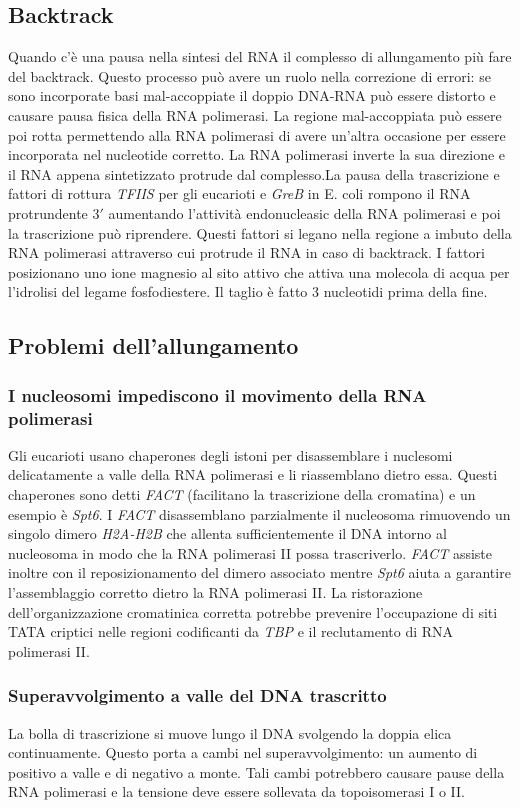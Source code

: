 \subsection{Backtrack}
Quando c'\`e una pausa nella sintesi del RNA il complesso di allungamento pi\`u fare del backtrack. Questo processo pu\`o avere un ruolo nella correzione di errori: se sono incorporate
basi mal-accoppiate il doppio DNA-RNA pu\`o essere distorto e causare pausa fisica della RNA polimerasi. La regione mal-accoppiata pu\`o essere poi rotta permettendo alla RNA polimerasi
di avere un'altra occasione per essere incorporata nel nucleotide corretto. La RNA polimerasi inverte la sua direzione e il RNA appena sintetizzato protrude dal complesso.La pausa
della trascrizione e fattori di rottura \emph{TFIIS} per gli eucarioti e \emph{GreB} in E. coli rompono il RNA protrundente $3'$ aumentando l'attivit\`a endonucleasic della RNA 
polimerasi e poi la trascrizione pu\`o riprendere. Questi fattori si legano nella regione a imbuto della RNA polimerasi attraverso cui protrude il RNA in caso di backtrack. I fattori 
posizionano uno ione magnesio al sito attivo che attiva una molecola di acqua per l'idrolisi del legame fosfodiestere. Il taglio \`e fatto $3$ nucleotidi prima della fine. 
\subsection{Problemi dell'allungamento}
\subsubsection{I nucleosomi impediscono il movimento della RNA polimerasi}
Gli eucarioti usano chaperones degli istoni per disassemblare i nuclesomi delicatamente a valle della RNA polimerasi e li riassemblano dietro essa. Questi chaperones sono detti 
\emph{FACT} (facilitano la trascrizione della cromatina) e un esempio \`e \emph{Spt6}. I \emph{FACT} disassemblano parzialmente il nucleosoma rimuovendo un singolo dimero
\emph{H2A-H2B} che allenta sufficientemente il DNA intorno al nucleosoma in modo che la RNA polimerasi II possa trascriverlo. \emph{FACT} assiste inoltre con il reposizionamento 
del dimero associato mentre \emph{Spt6} aiuta a garantire l'assemblaggio corretto dietro la RNA polimerasi II. La ristorazione dell'organizzazione cromatinica corretta potrebbe 
prevenire l'occupazione di siti TATA criptici nelle regioni codificanti da \emph{TBP} e il reclutamento di RNA polimerasi II. 
\subsubsection{Superavvolgimento a valle del DNA trascritto}
La bolla di trascrizione si muove lungo il DNA svolgendo la doppia elica continuamente. Questo porta a cambi nel superavvolgimento: un aumento di positivo a valle e di negativo a monte.
Tali cambi potrebbero causare pause della RNA polimerasi e la tensione deve essere sollevata da topoisomerasi I o II. 
